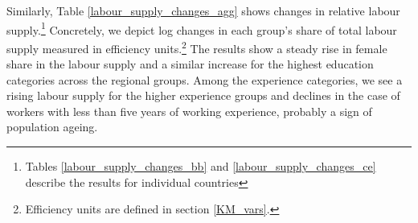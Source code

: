 \documentclass[11pt]{article}
\begin{document}

Similarly, Table \ref{labour_supply_changes_agg} shows changes in relative labour supply.\footnote{Tables \ref{labour_supply_changes_bb} and \ref{labour_supply_changes_ce} describe the results for individual countries} Concretely, we depict log changes in each group's share of total labour supply measured in efficiency units.\footnote{Efficiency units are defined in section \ref{KM_vars}.} The results show a steady rise in female share in the labour supply and a similar increase for the highest education categories across the regional groups. Among the experience categories, we see a rising labour supply for the higher experience groups and declines in the case of workers with less than five years of working experience, probably a sign of population ageing.

\end{document}
